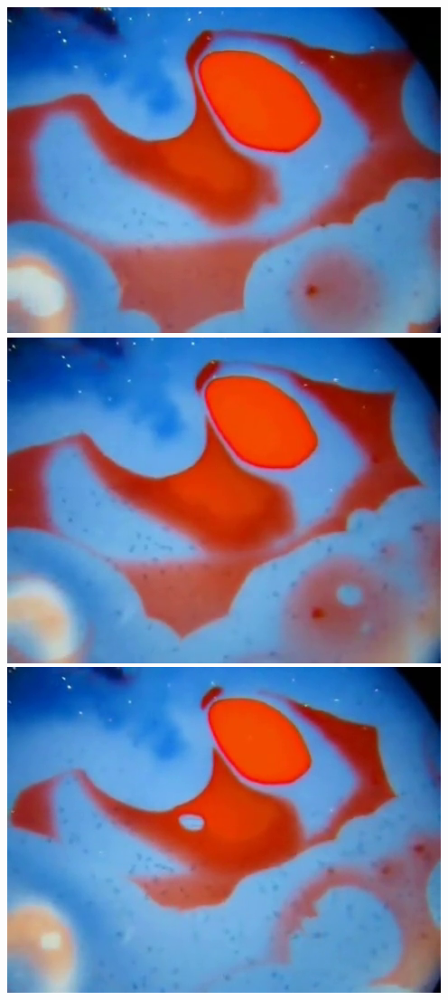 \documentclass[12pt]{report}
\begin{document}
{\includegraphics[scale=0.25]{BZ-frames0009.png}
\includegraphics[scale=0.25]{BZ-frames0010.png}
\includegraphics[scale=0.25]{BZ-frames0011.png}
}
\end{document}
